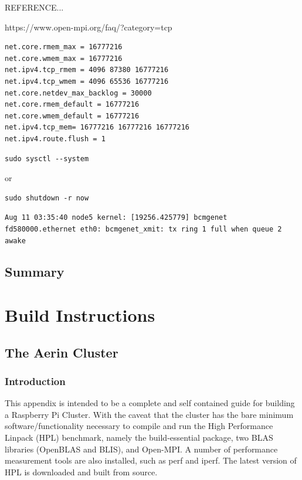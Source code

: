 \documentclass{report}
\begin{document}
REFERENCE...

https://www.open-mpi.org/faq/?category=tcp

\lstset{style=listingstyle}
\begin{lstlisting}[caption=/etc/sysctl.d/picluster.conf]
net.core.rmem_max = 16777216
net.core.wmem_max = 16777216
net.ipv4.tcp_rmem = 4096 87380 16777216
net.ipv4.tcp_wmem = 4096 65536 16777216
net.core.netdev_max_backlog = 30000
net.core.rmem_default = 16777216
net.core.wmem_default = 16777216
net.ipv4.tcp_mem= 16777216 16777216 16777216
net.ipv4.route.flush = 1
\end{lstlisting}


\lstset{style=type}
\begin{lstlisting}
sudo sysctl --system
\end{lstlisting}

or

\lstset{style=type}
\begin{lstlisting}
sudo shutdown -r now
\end{lstlisting}




\lstset{style=type}
\begin{lstlisting}
Aug 11 03:35:40 node5 kernel: [19256.425779] bcmgenet fd580000.ethernet eth0: bcmgenet_xmit: tx ring 1 full when queue 2 awake
\end{lstlisting}


%
%
\chapter{Summary}


%
%
\part{Build Instructions}

%
%
\chapter{The Aerin Cluster}

\section{Introduction}

This appendix is intended to be a complete and self contained guide for building a Raspberry Pi Cluster. With the caveat that the cluster has the bare minimum software/functionality necessary to compile and run the High Performance Linpack (HPL) benchmark, namely the build-essential package, two BLAS libraries (OpenBLAS and BLIS), and Open-MPI. A number of performance measurement tools are also installed, such as perf and iperf. The latest version of HPL is downloaded and built from source.
\end{document}
